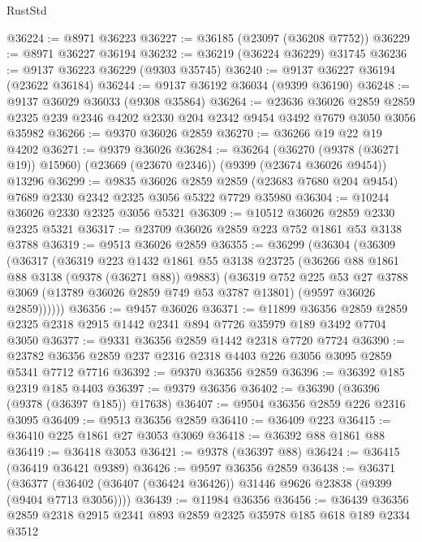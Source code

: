 \begin{lexlean}{RustStd}
\begin{coremodule}
@36224 := @8971 @36223
@36227 := @36185 (@23097 (@36208 @7752))
@36229 := @8971 @36227 @36194
@36232 := @36219 (@36224 @36229) @31745
@36236 := @9137 @36223 @36229 (@9303 @35745)
@36240 := @9137 @36227 @36194 (@23622 @36184)
@36244 := @9137 @36192 @36034 (@9399 @36190)
@36248 := @9137 @36029 @36033 (@9308 @35864)
@36264 := @23636
    @36026
    @2859
    @2859
    @2325
    @239
    @2346
    @4202
    @2330
    @204
    @2342
    @9454
    @3492
    @7679
    @3050
    @3056
    @35982
@36266 := @9370 @36026 @2859
@36270 := @36266 @19 @22 @19 @4202
@36271 := @9379 @36026
@36284 := @36264
    (@36270 (@9378 (@36271 @19)) @15960)
    (@23669 (@23670 @2346))
    (@9399 (@23674 @36026 @9454))
    @13296
@36299 := @9835
    @36026
    @2859
    @2859
    (@23683 @7680 @204 @9454)
    @7689
    @2330
    @2342
    @2325
    @3056
    @5322
    @7729
    @35980
@36304 := @10244 @36026 @2330 @2325 @3056 @5321
@36309 := @10512 @36026 @2859 @2330 @2325 @5321
@36317 := @23709 @36026 @2859 @223 @752 @1861 @53 @3138 @3788
@36319 := @9513 @36026 @2859
@36355 := @36299
    (@36304
      (@36309
        (@36317
          (@36319
            @223
            @1432
            @1861
            @55
            @3138
            @23725
            (@36266 @88 @1861 @88 @3138 (@9378 (@36271 @88)) @9883)
            (@36319
              @752
              @225
              @53
              @27
              @3788
              @3069
              (@13789 @36026 @2859 @749 @53 @3787 @13801)
              (@9597 @36026 @2859))))))
@36356 := @9457 @36026
@36371 := @11899
    @36356
    @2859
    @2859
    @2325
    @2318
    @2915
    @1442
    @2341
    @894
    @7726
    @35979
    @189
    @3492
    @7704
    @3050
@36377 := @9331 @36356 @2859 @1442 @2318 @7720 @7724
@36390 := @23782 @36356 @2859 @237 @2316 @2318 @4403 @226 @3056 @3095 @2859 @5341 @7712 @7716
@36392 := @9370 @36356 @2859
@36396 := @36392 @185 @2319 @185 @4403
@36397 := @9379 @36356
@36402 := @36390 (@36396 (@9378 (@36397 @185)) @17638)
@36407 := @9504 @36356 @2859 @226 @2316 @3095
@36409 := @9513 @36356 @2859
@36410 := @36409 @223
@36415 := @36410 @225 @1861 @27 @3053 @3069
@36418 := @36392 @88 @1861 @88
@36419 := @36418 @3053
@36421 := @9378 (@36397 @88)
@36424 := @36415 (@36419 @36421 @9389)
@36426 := @9597 @36356 @2859
@36438 := @36371
    (@36377 (@36402 (@36407 (@36424 @36426)) @31446 @9626 @23838 (@9399 (@9404 @7713 @3056))))
@36439 := @11984 @36356
@36456 := @36439
    @36356
    @2859
    @2318
    @2915
    @2341
    @893
    @2859
    @2325
    @35978
    @185
    @618
    @189
    @2334
    @3512

\end{coremodule}
\end{lexlean}

